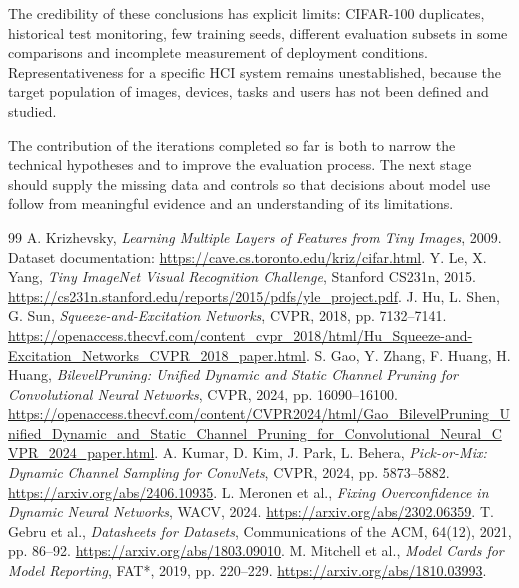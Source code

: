 \documentclass[12pt,a4paper]{article}
\begin{document}
The credibility of these conclusions has explicit limits:
CIFAR-100 duplicates, historical test monitoring, few training seeds,
different evaluation subsets in some comparisons and incomplete
measurement of deployment conditions.
Representativeness for a specific HCI system remains unestablished,
because the target population of images, devices, tasks and users
has not been defined and studied.

The contribution of the iterations completed so far is both to narrow
the technical hypotheses and to improve the evaluation process.
The next stage should supply the missing data and controls so that
decisions about model use follow from meaningful evidence and
an understanding of its limitations.

\begin{thebibliography}{99}
 A. Krizhevsky, \emph{Learning Multiple Layers of Features
from Tiny Images}, 2009. Dataset documentation:
\url{https://cave.cs.toronto.edu/kriz/cifar.html}.
 Y. Le, X. Yang, \emph{Tiny ImageNet Visual Recognition
Challenge}, Stanford CS231n, 2015.
\url{https://cs231n.stanford.edu/reports/2015/pdfs/yle_project.pdf}.
 J. Hu, L. Shen, G. Sun,
\emph{Squeeze-and-Excitation Networks}, CVPR, 2018, pp. 7132--7141.
\url{https://openaccess.thecvf.com/content_cvpr_2018/html/Hu_Squeeze-and-Excitation_Networks_CVPR_2018_paper.html}.
 S. Gao, Y. Zhang, F. Huang, H. Huang,
\emph{BilevelPruning: Unified Dynamic and Static Channel Pruning for
Convolutional Neural Networks}, CVPR, 2024, pp. 16090--16100.
\url{https://openaccess.thecvf.com/content/CVPR2024/html/Gao_BilevelPruning_Unified_Dynamic_and_Static_Channel_Pruning_for_Convolutional_Neural_CVPR_2024_paper.html}.
 A. Kumar, D. Kim, J. Park, L. Behera,
\emph{Pick-or-Mix: Dynamic Channel Sampling for ConvNets}, CVPR, 2024,
pp. 5873--5882. \url{https://arxiv.org/abs/2406.10935}.
 L. Meronen et al.,
\emph{Fixing Overconfidence in Dynamic Neural Networks}, WACV, 2024.
\url{https://arxiv.org/abs/2302.06359}.
 T. Gebru et al., \emph{Datasheets for Datasets},
Communications of the ACM, 64(12), 2021, pp. 86--92.
\url{https://arxiv.org/abs/1803.09010}.
 M. Mitchell et al., \emph{Model Cards for Model Reporting},
FAT*, 2019, pp. 220--229. \url{https://arxiv.org/abs/1810.03993}.
\end{thebibliography}
\end{document}
